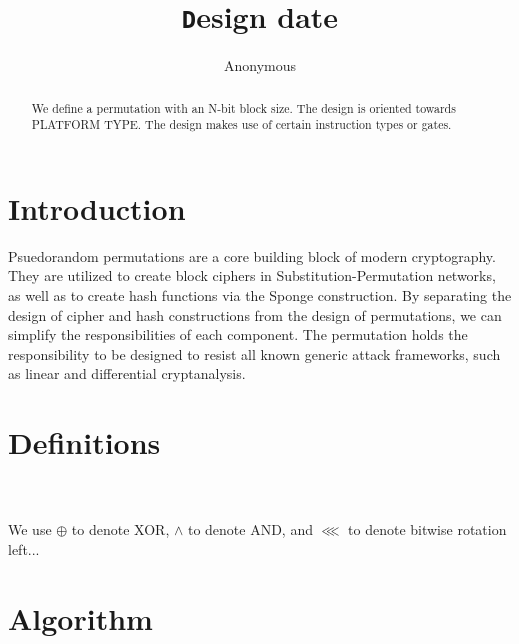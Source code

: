 \documentclass[preprint]{iacrtrans}
\author{Anonymous\inst{1}}
\institute{City, State \email{address@provider.com}}
\title[\texttt Design date]{\texttt Design date}
\begin{document}
\maketitle


\begin{abstract}
  We define a permutation with an N-bit block size. The design is oriented towards PLATFORM TYPE. The design makes use of certain instruction types or gates. \\ 
\end{abstract}

\todototoc
\listoftodos

\section{Introduction}
 Psuedorandom permutations are a core building block of modern cryptography. They are utilized to create block ciphers in Substitution-Permutation networks, as well as to create hash functions via the Sponge construction. By separating the design of cipher and hash constructions from the design of permutations, we can simplify the responsibilities of each component. The permutation holds the responsibility to be designed to resist all known generic attack frameworks, such as linear and differential cryptanalysis. 



\section{Definitions}
\\
\\
We use $\oplus$ to denote XOR, $\land$ to denote AND, and $\lll$ to denote bitwise rotation left...

\section{Algorithm}
\\
\\
\end{document}
